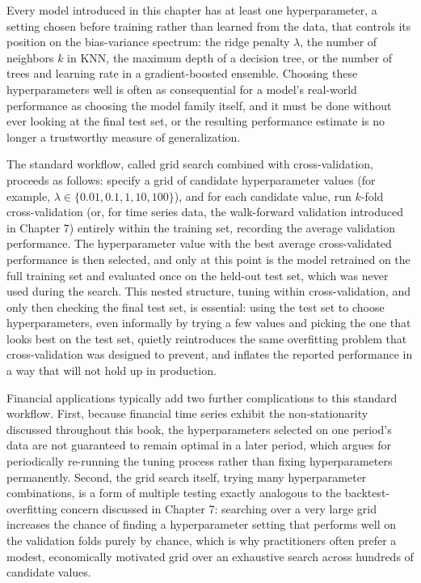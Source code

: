 \documentclass[../ai_in_finance]{subfiles}
\begin{document}
Every model introduced in this chapter has at least one hyperparameter, a setting chosen before training rather than learned from the data, that controls its position on the bias-variance spectrum: the ridge penalty $\lambda$, the number of neighbors $k$ in KNN, the maximum depth of a decision tree, or the number of trees and learning rate in a gradient-boosted ensemble. Choosing these hyperparameters well is often as consequential for a model's real-world performance as choosing the model family itself, and it must be done without ever looking at the final test set, or the resulting performance estimate is no longer a trustworthy measure of generalization.

The standard workflow, called grid search combined with cross-validation, proceeds as follows: specify a grid of candidate hyperparameter values (for example, $\lambda \in \{0.01, 0.1, 1, 10, 100\}$), and for each candidate value, run $k$-fold cross-validation (or, for time series data, the walk-forward validation introduced in Chapter 7) entirely within the training set, recording the average validation performance. The hyperparameter value with the best average cross-validated performance is then selected, and only at this point is the model retrained on the full training set and evaluated once on the held-out test set, which was never used during the search. This nested structure, tuning within cross-validation, and only then checking the final test set, is essential: using the test set to choose hyperparameters, even informally by trying a few values and picking the one that looks best on the test set, quietly reintroduces the same overfitting problem that cross-validation was designed to prevent, and inflates the reported performance in a way that will not hold up in production.

Financial applications typically add two further complications to this standard workflow. First, because financial time series exhibit the non-stationarity discussed throughout this book, the hyperparameters selected on one period's data are not guaranteed to remain optimal in a later period, which argues for periodically re-running the tuning process rather than fixing hyperparameters permanently. Second, the grid search itself, trying many hyperparameter combinations, is a form of multiple testing exactly analogous to the backtest-overfitting concern discussed in Chapter 7: searching over a very large grid increases the chance of finding a hyperparameter setting that performs well on the validation folds purely by chance, which is why practitioners often prefer a modest, economically motivated grid over an exhaustive search across hundreds of candidate values.
\end{document}
